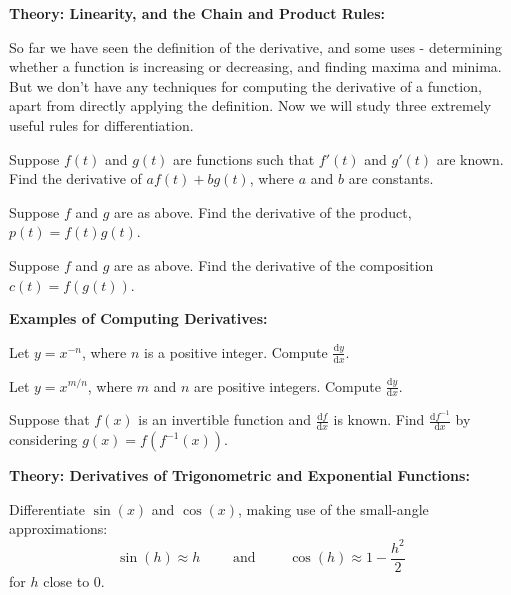 \documentclass{article}
\newcommand{\deriv}[2]{\frac{\mathrm{d}#1}{\mathrm{d}#2}}
\begin{document}
\clearpage


{\bf Theory: Linearity, and the Chain and Product Rules:}

\vspace{5mm}

So far we have seen the definition of the derivative, and some uses - determining whether a function is increasing or decreasing, and finding maxima and minima. But we don't have any techniques for computing the derivative of a function, apart from directly applying the definition. Now we will study three extremely useful rules for differentiation.\bigskip

Suppose $f(t)$ and $g(t)$ are functions such that $f'(t)$ and $g'(t)$ are known. Find the derivative of $af(t)+bg(t)$, where $a$ and $b$ are constants.

\vfill


Suppose $f$ and $g$ are as above. Find the derivative of the product, $p(t)=f(t)g(t)$.

\vfill


Suppose $f$ and $g$ are as above. Find the derivative of the composition $c(t)=f(g(t))$.

\vfill



\clearpage



\textbf{Examples of Computing Derivatives:}

\vspace{5mm}


Let $y=x^{-n}$, where $n$ is a positive integer. Compute $\deriv{y}{x}$.

\vfill


Let $y=x^{m/n}$, where $m$ and $n$ are positive integers. Compute $\deriv{y}{x}$.

\vfill

Suppose that $f(x)$ is an invertible function and $\deriv{f}{x}$ is known. Find $\deriv{f^{-1}}{x}$ by considering $g(x)=f(f^{-1}(x))$.



\clearpage








\textbf{Theory: Derivatives of Trigonometric and Exponential Functions:}

\vspace{5mm}


Differentiate $\sin(x)$ and $\cos(x)$, making use of the small-angle approximations:
\[\sin(h)\approx h\qquad\mbox{ and } \qquad\cos(h)\approx 1-\frac{h^2}{2}\]
for $h$ close to 0.
\end{document}
